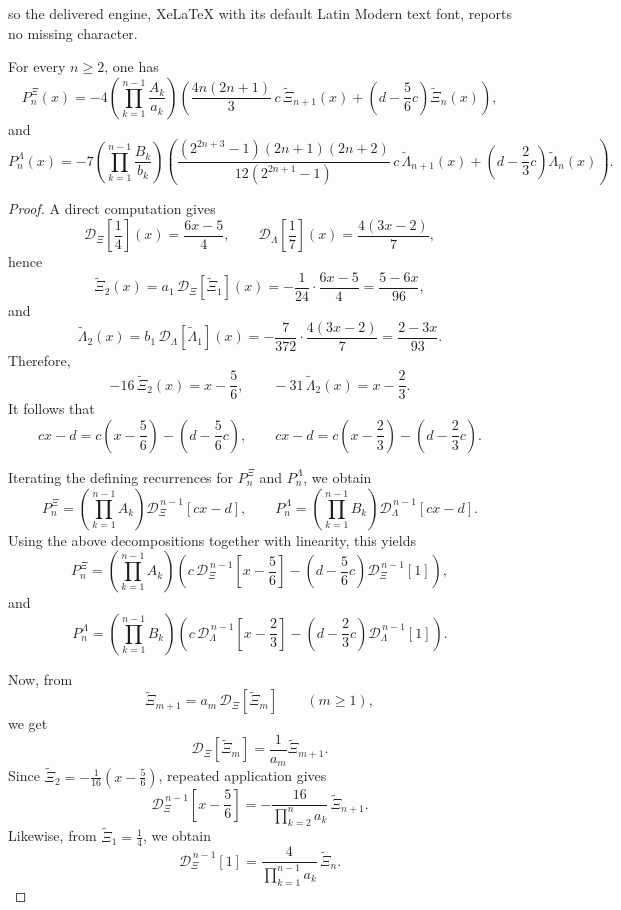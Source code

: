 \documentclass[10pt,a4paper]{amsart}
\begin{document}
so the delivered engine, XeLaTeX with its default Latin Modern text font, reports no missing character.
\begin{proposition}\label{prop:closed-form-iterates}
For every \(n\ge2\), one has
\[
P_n^\Xi(x)
=
-4\left(\displaystyle\prod_{k=1}^{n-1}\frac{A_k}{a_k}\right)
\left(
\frac{4n(2n+1)}{3}\,c\,\widetilde{\Xi}_{n+1}(x)
+
\left(d-\frac56c\right)\widetilde{\Xi}_n(x)
\right),
\]
and
\[
P_n^\Lambda(x)
=
-7\left(\displaystyle\prod_{k=1}^{n-1}\frac{B_k}{b_k}\right)
\left(
\frac{(2^{2n+3}-1)(2n+1)(2n+2)}{12(2^{2n+1}-1)}\,c\,\widetilde{\Lambda}_{n+1}(x)
+
\left(d-\frac23c\right)\widetilde{\Lambda}_n(x)
\right).
\]
\end{proposition}

\begin{proof}
A direct computation gives
\[
\mathcal D_{\Xi}\!\left[\frac14\right](x)=\frac{6x-5}{4},
\qquad
\mathcal D_{\Lambda}\!\left[\frac17\right](x)=\frac{4(3x-2)}{7},
\]
hence
\[
\widetilde{\Xi}_2(x)
=
a_1\,\mathcal D_{\Xi}\!\left[\widetilde{\Xi}_1\right](x)
=
-\frac{1}{24}\cdot\frac{6x-5}{4}
=
\frac{5-6x}{96},
\]
and
\[
\widetilde{\Lambda}_2(x)
=
b_1\,\mathcal D_{\Lambda}\!\left[\widetilde{\Lambda}_1\right](x)
=
-\frac{7}{372}\cdot\frac{4(3x-2)}{7}
=
\frac{2-3x}{93}.
\]
Therefore,
\[
-16\,\widetilde{\Xi}_2(x)=x-\frac56,
\qquad
-31\,\widetilde{\Lambda}_2(x)=x-\frac23.
\]
It follows that
\[
cx-d
=
c\left(x-\frac56\right)-\left(d-\frac56c\right),
\qquad
cx-d
=
c\left(x-\frac23\right)-\left(d-\frac23c\right).
\]

Iterating the defining recurrences for \(P_n^\Xi\) and \(P_n^\Lambda\), we obtain
\[
P_n^\Xi
=
\left(\displaystyle\prod_{k=1}^{n-1}A_k\right)\mathcal D_\Xi^{\,n-1}[cx-d],
\qquad
P_n^\Lambda
=
\left(\displaystyle\prod_{k=1}^{n-1}B_k\right)\mathcal D_\Lambda^{\,n-1}[cx-d].
\]
Using the above decompositions together with linearity, this yields
\[
P_n^\Xi
=
\left(\displaystyle\prod_{k=1}^{n-1}A_k\right)
\left(
c\,\mathcal D_\Xi^{\,n-1}\!\left[x-\frac56\right]
-
\left(d-\frac56c\right)\mathcal D_\Xi^{\,n-1}[1]
\right),
\]
and
\[
P_n^\Lambda
=
\left(\displaystyle\prod_{k=1}^{n-1}B_k\right)
\left(
c\,\mathcal D_\Lambda^{\,n-1}\!\left[x-\frac23\right]
-
\left(d-\frac23c\right)\mathcal D_\Lambda^{\,n-1}[1]
\right).
\]

Now, from
\[
\widetilde{\Xi}_{m+1}=a_m\,\mathcal D_\Xi[\widetilde{\Xi}_m]
\qquad (m\ge1),
\]
we get
\[
\mathcal D_\Xi[\widetilde{\Xi}_m]=\frac{1}{a_m}\widetilde{\Xi}_{m+1}.
\]
Since \(\widetilde{\Xi}_2=-\frac1{16}\left(x-\frac56\right)\), repeated application gives
\[
\mathcal D_\Xi^{\,n-1}\!\left[x-\frac56\right]
=
-\frac{16}{\displaystyle\prod_{k=2}^{n}a_k}\,\widetilde{\Xi}_{n+1}.
\]
Likewise, from \(\widetilde{\Xi}_1=\frac14\), we obtain
\[
\mathcal D_\Xi^{\,n-1}[1]
=
\frac{4}{\displaystyle\prod_{k=1}^{n-1}a_k}\,\widetilde{\Xi}_n.
\]


\end{proof}
\end{document}
